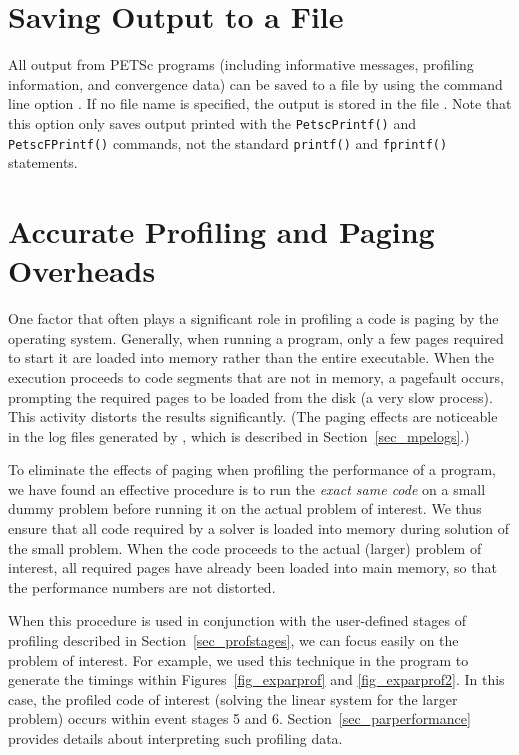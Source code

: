 {{%
\section{Saving Output to a File}

All output from PETSc programs (including informative messages, profiling information,
and convergence data) can be saved to a file by using the command line
option . 
If no file name is specified, the output is stored in the file .
 Note that this option only saves output printed with
the \lstinline{PetscPrintf()} and \lstinline{PetscFPrintf()} commands, not the
standard \lstinline{printf()} and \lstinline{fprintf()} statements.

\section{Accurate Profiling and Paging Overheads}
\label{sec_profaccuracy}

One factor that often plays a significant role in profiling a code is
paging by the operating system.  Generally, when running a program,
only a few pages required to start it are loaded into memory rather
than the entire executable.  When the execution proceeds to code
segments that are not in memory, a pagefault occurs, prompting the
required pages to be loaded from the disk (a very slow process).  This
activity distorts the results significantly. (The paging effects are
noticeable in the log files generated by , which is
described in Section~\ref{sec_mpelogs}.)

To eliminate the effects of paging when profiling the performance of a
program, we have found an effective procedure is to run the \emph{exact same code}
on a small dummy problem before running it on the actual problem
of interest. We thus ensure that all code required by a solver is
loaded into memory during solution of the small problem.  When the
code proceeds to the actual (larger) problem of interest, all required
pages have already been loaded into main memory, so that the
performance numbers are not distorted.

When this procedure is used in conjunction with the user-defined stages of profiling
described in Section~\ref{sec_profstages}, we can focus easily on the
problem of interest.  For example, we used this technique in the program
\href{https://www.mcs.anl.gov/petsc/petsc-current/src/ksp/ksp/tutorials/ex10.c.html}{} to
generate the timings within Figures~\ref{fig_exparprof} and \ref{fig_exparprof2}.
In this case,
the profiled code of interest (solving the linear system for the larger problem)
occurs within event stages 5 and 6.  Section~\ref{sec_parperformance} provides
details about interpreting such profiling data.

}}
